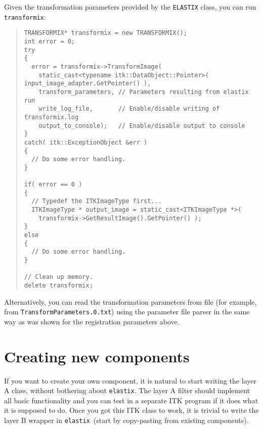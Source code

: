 \documentclass[]{report}
\newcommand{\elastix}{\texttt{elastix}}
\newcommand{\transformix}{\texttt{transformix}}
\begin{document}
Given the transformation parameters provided by the \texttt{ELASTIX}
class, you can run \transformix:
\begin{quote}
\begin{verbatim}
TRANSFORMIX* transformix = new TRANSFORMIX();
int error = 0;
try
{
  error = transformix->TransformImage(
    static_cast<typename itk::DataObject::Pointer>( input_image_adapter.GetPointer() ),
    transform_parameters, // Parameters resulting from elastix run
    write_log_file,       // Enable/disable writing of transformix.log
    output_to_console);   // Enable/disable output to console
}
catch( itk::ExceptionObject &err )
{
  // Do some error handling.
}

if( error == 0 )
{
  // Typedef the ITKImageType first...
  ITKImageType * output_image = static_cast<ITKImageType *>(
    transformix->GetResultImage().GetPointer() );
}
else
{
  // Do some error handling.
}

// Clean up memory.
delete transformix;
\end{verbatim}
\end{quote}
Alternatively, you can read the transformation parameters from file
(for example, from \texttt{TransformParameters.0.txt}) using the
parameter file parser in the same way as was shown for the
registration parameters above.

\section{Creating new components}\label{sec:dev:newcomp}

If you want to create your own component, it is natural to start writing the
layer A class, without bothering about \elastix. The layer A filter should
implement all basic functionality and you can test in a separate ITK program if
it does what it is supposed to do. Once you got this ITK class to work, it is
trivial to write the layer B wrapper in \elastix\ (start by copy-pasting from
existing components).
\end{document}
